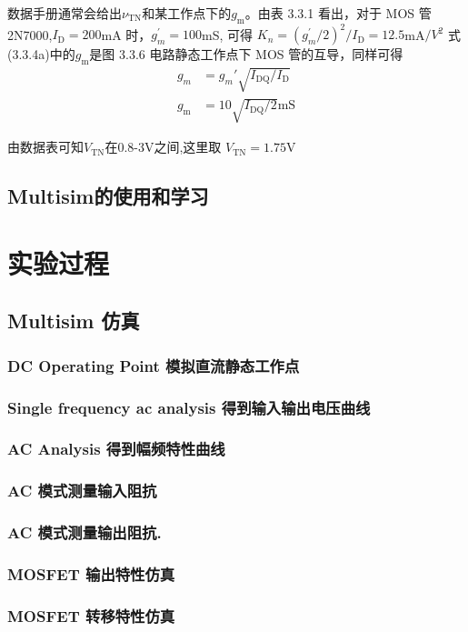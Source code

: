 \documentclass[a4paper,11pt,UTF8]{article}
\numberwithin{equation}{subsection}
\begin{document}
数据手册通常会给出$\nu_\mathrm{TN}$和某工作点下的$g_\mathrm{m}$。由表 3.3.1 看出，对于 MOS 管 2N7000,$I_{\mathrm{D} }= 200$mA 时，$g_m^{\prime}= 100$mS, 可得 $K_n= ( g_m^{\prime}/2) ^2/I_{\mathrm{D} }= 12.5$mA$/V^2$ 式(3.3.4a)中的$g_\mathrm{m}$是图 3.3.6 电路静态工作点下 MOS 管的互导，同样可得
\begin{align}
	g_m&=g_m'\sqrt{I_{\mathrm{DQ}}/I_{\mathrm{D}}}\\
	g_{\mathrm{m}}&=10\sqrt{I_{\mathrm{DQ}}/2}\mathrm{mS}
\end{align}

由数据表可知$V_{\mathrm{TN}}$在0.8-3V之间,这里取 $V_{\mathrm{TN}}=1.75\mathrm{V}$
\subsection{Multisim的使用和学习}
\section{实验过程}
\subsection{Multisim 仿真}
\subsubsection{DC Operating Point 模拟直流静态工作点}
\subsubsection{Single frequency ac analysis 得到输入输出电压曲线}
\subsubsection{AC Analysis 得到幅频特性曲线}
\subsubsection{AC 模式测量输入阻抗}
\subsubsection{AC 模式测量输出阻抗.}
\subsubsection{MOSFET 输出特性仿真}
\subsubsection{MOSFET 转移特性仿真}
\end{document}
